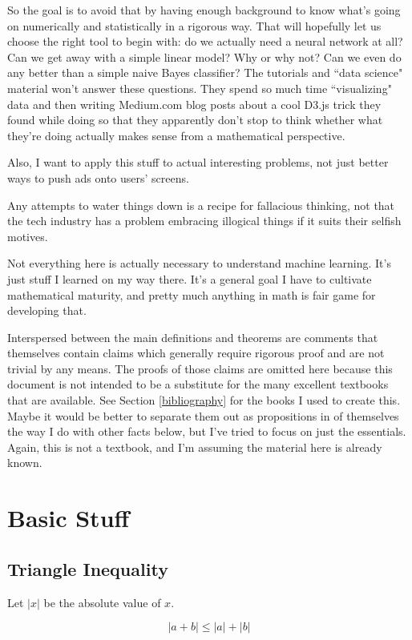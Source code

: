 \documentclass{article}
\theoremstyle{definition}
\begin{document}
So the goal is to avoid that by having enough background to know what's going on numerically and statistically in a rigorous way. That will hopefully let us choose the right tool to begin with: do we actually need a neural network at all? Can we get away with a simple linear model? Why or why not? Can we even do any better than a simple naive Bayes classifier? The tutorials and ``data science" material won't answer these questions. They spend so much time ``visualizing" data and then writing Medium.com blog posts about a cool D3.js trick they found while doing so that they apparently don't stop to think whether what they're doing actually makes sense from a mathematical perspective.

Also, I want to apply this stuff to actual interesting problems, not just better ways to push ads onto users' screens.

Any attempts to water things down is a recipe for fallacious thinking, not that the tech industry has a problem embracing illogical things if it suits their selfish motives.

Not everything here is actually necessary to understand machine learning. It's just stuff I learned on my way there. It's a general goal I have to cultivate mathematical maturity, and pretty much anything in math is fair game for developing that.

Interspersed between the main definitions and theorems are comments that themselves contain claims which generally require rigorous proof and are not trivial by any means. The proofs of those claims are omitted here because this document is not intended to be a substitute for the many excellent textbooks that are available. See Section \ref{bibliography} for the books I used to create this. Maybe it would be better to separate them out as propositions in of themselves the way I do with other facts below, but I've tried to focus on just the essentials. Again, this is not a textbook, and I'm assuming the material here is already known.

\section{Basic Stuff}

\subsection{Triangle Inequality}
Let $|x|$ be the absolute value of $x$.

\begin{equation} \label{triangle-inequality}
|a + b| \leq |a| + |b| 
\end{equation}
\end{document}
